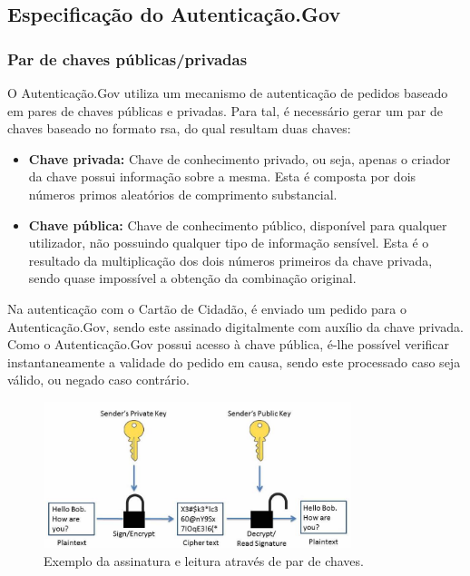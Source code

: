 \subsection{Especificação do Autenticação.Gov}
\subsubsection{Par de chaves públicas/privadas}

O Autenticação.Gov utiliza um mecanismo de autenticação de pedidos baseado em pares de chaves públicas e privadas. Para tal, é necessário gerar um par de chaves baseado no formato \gls{rsa}, do qual resultam duas chaves:
\begin{itemize}
    \item \textbf{Chave privada: }
    Chave de conhecimento privado, ou seja, apenas o criador da chave possui informação sobre a mesma. Esta é composta por dois números primos aleatórios de comprimento substancial.
    
    \item \textbf{Chave pública: }
    Chave de conhecimento público, disponível para qualquer utilizador, não possuindo qualquer tipo de informação sensível. Esta é o resultado da multiplicação dos dois números primeiros da chave privada, sendo quase impossível a obtenção da combinação original.
\end{itemize}

Na autenticação com o Cartão de Cidadão, é enviado um pedido para o Autenticação.Gov, sendo este assinado digitalmente com auxílio da chave privada. 
Como o Autenticação.Gov possui acesso à chave pública, é-lhe possível verificar instantaneamente a validade do pedido em causa, sendo este processado caso seja válido, ou negado caso contrário.

\begin{figure}[h]
    \centering
    \includegraphics[width=0.80\textwidth]{img/cc/OpenPGPSign.jpg}
    \caption{Exemplo da assinatura e leitura através de par de chaves.}
    \label{fig:par_chaves}
\end{figure}

